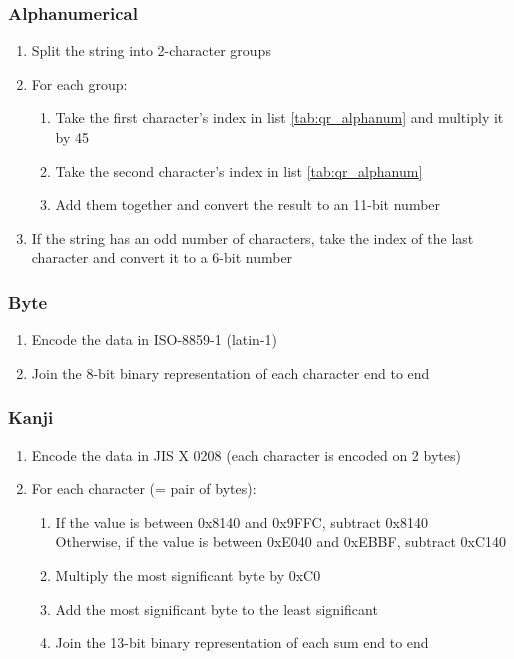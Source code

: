 \subsubsection{Alphanumerical}
\label{sssec:qr_encoding_alpha}

\begin{enumerate}
  \item Split the string into 2-character groups
  \item For each group:
  \begin{enumerate}
    \item Take the first character's index in list \ref{tab:qr_alphanum} and multiply it by 45
    \item Take the second character's index in list \ref{tab:qr_alphanum}
    \item Add them together and convert the result to an 11-bit number
  \end{enumerate}
  \item If the string has an odd number of characters, take the index of the last character and convert it to a 6-bit number
\end{enumerate}

\subsubsection{Byte}
\label{sssec:qr_encoding_byte}

\begin{enumerate}
  \item Encode the data in ISO-8859-1 (latin-1)
  \item Join the 8-bit binary representation of each character end to end
\end{enumerate}

\subsubsection{Kanji}
\label{sssec:qr_encoding_kanji}

\begin{enumerate}
  \item Encode the data in JIS X 0208 (each character is encoded on 2 bytes)
  \item For each character (= pair of bytes):
  \begin{enumerate}
    \item If the value is between 0x8140 and 0x9FFC, subtract 0x8140 \\
    Otherwise, if the value is between 0xE040 and 0xEBBF, subtract 0xC140
    \item Multiply the most significant byte by 0xC0
    \item Add the most significant byte to the least significant
    \item Join the 13-bit binary representation of each sum end to end
  \end{enumerate}
\end{enumerate}


